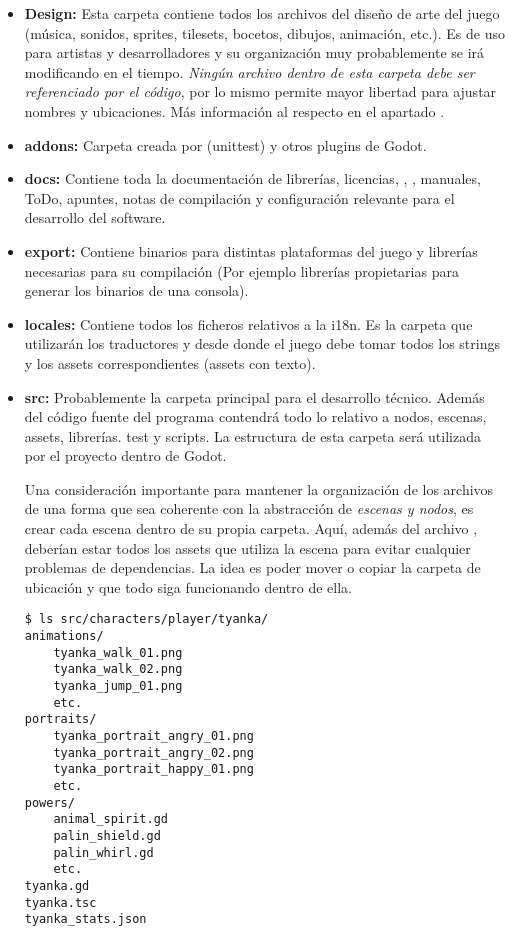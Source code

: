\begin{itemize}
\item \textbf{Design:} Esta carpeta contiene todos los archivos del diseño de arte del juego (música, sonidos, sprites, tilesets, bocetos, dibujos, animación, etc.). Es de uso para artistas y desarrolladores y su organización muy probablemente se irá modificando en el tiempo. \emph{Ningún archivo dentro de esta carpeta debe ser referenciado por el código}, por lo mismo permite mayor libertad para ajustar nombres y ubicaciones. Más información al respecto en el apartado .

\item \textbf{addons:} Carpeta creada por  (unittest) y otros plugins de Godot.

\item \textbf{docs:} Contiene toda la documentación de librerías, licencias, , , manuales, ToDo, apuntes, notas de compilación y configuración relevante para el desarrollo del software.

\item \textbf{export:} Contiene binarios para distintas plataformas del juego y librerías necesarias para su compilación (Por ejemplo librerías propietarias para generar los binarios de una consola).

\item \textbf{locales:} Contiene todos los ficheros relativos a la i18n. Es la carpeta que utilizarán los traductores y desde donde el juego debe tomar todos los strings y los assets correspondientes (assets con texto).

\item \textbf{src:} Probablemente la carpeta principal para el desarrollo técnico. Además del código fuente del programa contendrá todo lo relativo a nodos, escenas, assets, librerías. test y scripts. La estructura de esta carpeta será utilizada por el proyecto dentro de Godot.

Una consideración importante para mantener la organización de los archivos de una forma que sea coherente con la abstracción de \textit{escenas y nodos}, es crear cada escena dentro de su propia carpeta. Aquí, además del archivo , deberían estar todos los assets que utiliza la escena para evitar cualquier problemas de dependencias. La idea es poder mover o copiar la carpeta de ubicación y que todo siga funcionando dentro de ella.

\begin{lstlisting}
$ ls src/characters/player/tyanka/
animations/
    tyanka_walk_01.png
    tyanka_walk_02.png
    tyanka_jump_01.png
    etc.
portraits/
    tyanka_portrait_angry_01.png
    tyanka_portrait_angry_02.png
    tyanka_portrait_happy_01.png
    etc.
powers/
    animal_spirit.gd
    palin_shield.gd
    palin_whirl.gd
    etc.
tyanka.gd
tyanka.tsc
tyanka_stats.json
\end{lstlisting}


\end{itemize}
